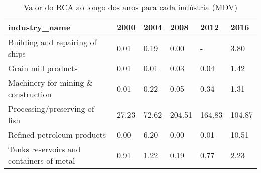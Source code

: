 \begin{table}
\centering
\caption{Valor do RCA ao longo dos anos para cada indústria (MDV)}
\begin{tabular}{p{6cm}p{1.5cm}p{1.5cm}p{1.5cm}p{1.5cm}p{1.5cm}}
\toprule
                           industry\_name &  2000 &  2004 &   2008 &   2012 &   2016 \\
\midrule
         Building and repairing of ships &  0.01 &  0.19 &   0.00 &      - &   3.80 \\
                     Grain mill products &  0.01 &  0.01 &   0.03 &   0.04 &   1.42 \\
     Machinery for mining \& construction &  0.01 &  0.22 &   0.05 &   0.34 &   1.31 \\
           Processing/preserving of fish & 27.23 & 72.62 & 204.51 & 164.83 & 104.87 \\
              Refined petroleum products &  0.00 &  6.20 &   0.00 &   0.01 &  10.51 \\
Tanks reservoirs and containers of metal &  0.91 &  1.22 &   0.19 &   0.77 &   2.23 \\
\bottomrule
\end{tabular}
\end{table}
